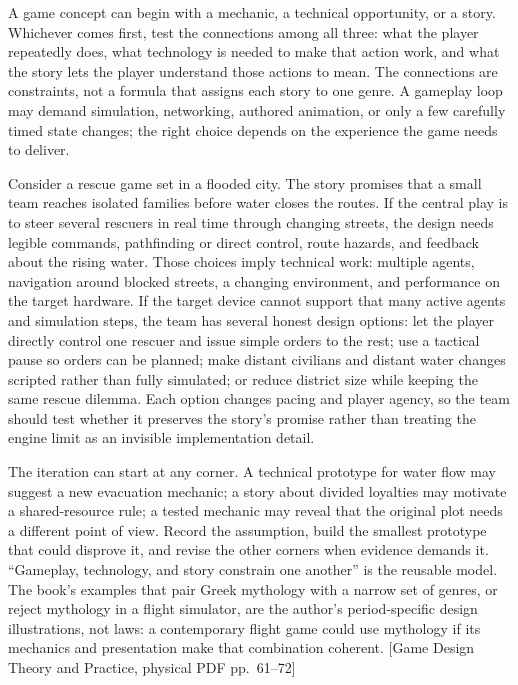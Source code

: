 \hypertarget{05-engine-i-ch009-design-by-connecting-play-technology-and-story}{}

A game concept can begin with a mechanic, a technical opportunity, or a story. Whichever comes first, test the connections among all three: what the player repeatedly does, what technology is needed to make that action work, and what the story lets the player understand those actions to mean. The connections are constraints, not a formula that assigns each story to one genre. A gameplay loop may demand simulation, networking, authored animation, or only a few carefully timed state changes; the right choice depends on the experience the game needs to deliver.

Consider a rescue game set in a flooded city. The story promises that a small team reaches isolated families before water closes the routes. If the central play is to steer several rescuers in real time through changing streets, the design needs legible commands, pathfinding or direct control, route hazards, and feedback about the rising water. Those choices imply technical work: multiple agents, navigation around blocked streets, a changing environment, and performance on the target hardware. If the target device cannot support that many active agents and simulation steps, the team has several honest design options: let the player directly control one rescuer and issue simple orders to the rest; use a tactical pause so orders can be planned; make distant civilians and distant water changes scripted rather than fully simulated; or reduce district size while keeping the same rescue dilemma. Each option changes pacing and player agency, so the team should test whether it preserves the story's promise rather than treating the engine limit as an invisible implementation detail.

The iteration can start at any corner. A technical prototype for water flow may suggest a new evacuation mechanic; a story about divided loyalties may motivate a shared-resource rule; a tested mechanic may reveal that the original plot needs a different point of view. Record the assumption, build the smallest prototype that could disprove it, and revise the other corners when evidence demands it. ``Gameplay, technology, and story constrain one another'' is the reusable model. The book's examples that pair Greek mythology with a narrow set of genres, or reject mythology in a flight simulator, are the author's period-specific design illustrations, not laws: a contemporary flight game could use mythology if its mechanics and presentation make that combination coherent. {[}Game Design Theory and Practice, physical PDF pp.~61--72{]}

